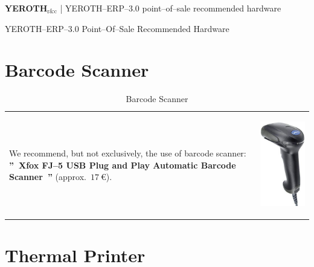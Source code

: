 \documentclass[12pt, a4paper]{article}
\newcommand{\yerothrc}{\textcolor{yerothColorGreen}
			{\textsc{\textcolor{yerothColorRed}{YEROTH}}$_{\text{r\&c}}$\xspace}}
\newcommand{\yerotherpblack}{YEROTH--ERP--$3.0$\xspace}
\newcommand{\money}[1]{$#1\ \euro{}$\xspace}
\begin{document}
{\bf \LARGE \yerothrc} {| \sc \scriptsize \yerotherpblack point--of--sale recommended hardware}

\vspace{2.5em}


\parbox{27em}{\LARGE \yerotherpblack Point--Of--Sale Recommended Hardware}

\vspace{1.0em}

\section{Barcode Scanner}
\vspace{-3.7em}

\begin{table}[!htbp]
\begin{tabular}{lr}
\parbox{25em}{
We recommend, but not exclusively, the use 
of barcode scanner:
\textbf{''~Xfox FJ--5 USB Plug and Play Automatic
Barcode Scanner~''} (approx.~\money{17}).
\vspace{-3em}
}

&

\parbox{17em}{
\begin{center}
\includegraphics[scale=0.2]{images/xfox-fj-5-usb-plug-and-play-automatic-barcode-scanner.png}
\caption*{Barcode Scanner}
\end{center}
}
\end{tabular}
\end{table}

\vspace{-0.8em}
\section{Thermal Printer}
\vspace{-2.7em}
\end{document}
